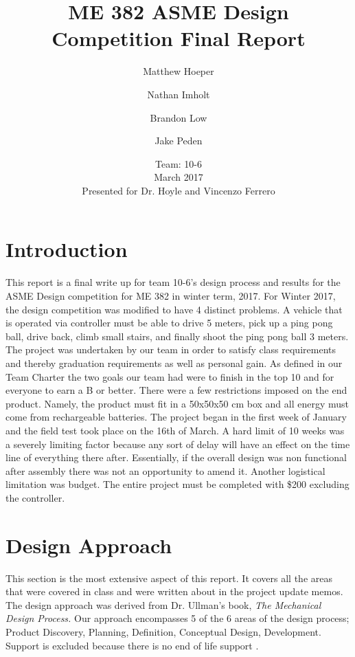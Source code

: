 \documentclass[12pt,letterpaper,titlepage]{article}
\begin{document}
	\title{ME 382 ASME Design Competition Final Report}
	\date{ Team: 10-6 \\
		 March 2017 \\
		\medskip	
		Presented for Dr. Hoyle and Vincenzo Ferrero}
	\author{Matthew Hoeper
		\and Nathan Imholt
		\and Brandon Low
		\and Jake Peden
		}
		
	
	\maketitle
\graphicspath{{.images/}}
\tableofcontents
\listoffigures
\pagebreak
\section{Introduction}
This report is a final write up for team 10-6's design process and results for the ASME Design competition for ME 382 in winter term, 2017. For Winter 2017, the design competition was modified to have 4 distinct problems. A vehicle that is operated via controller must be able to drive 5 meters, pick up a ping pong ball, drive back, climb small stairs, and finally shoot the ping pong ball 3 meters. The project was undertaken by our team in order to satisfy class requirements and thereby graduation requirements as well as personal gain. As defined in our Team Charter the two goals our team had were to finish in the top 10 and for everyone to earn a B or better. There were a few restrictions imposed on the end product. Namely, the product must fit in a 50x50x50 cm box and all energy must come from rechargeable batteries. The project began in the first week of January and the field test took place on the 16th of March. A hard limit of 10 weeks was a severely limiting factor because any sort of delay will have an effect on the time line of everything there after. Essentially, if the overall design was non functional after assembly there was not an opportunity to amend it. Another logistical limitation was budget. The entire project must be completed with \$200 excluding the controller.  
\section{Design Approach}

This section is the most extensive aspect of this report. It covers all the areas that were covered in class and were written about in the project update memos. The design approach was derived from Dr. Ullman's book, \textit{The Mechanical Design Process.} Our approach encompasses 5 of the 6 areas of the design process; Product Discovery, Planning, Definition, Conceptual Design, Development. Support is excluded because there is no end of life support \cite{textbook}. 
\end{document}
